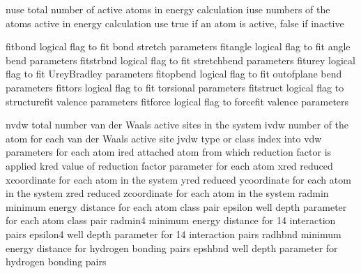 \documentclass[letterpaper,11pt,english]{sphinxmanual}
\begin{document}
\begin{sphinxVerbatim}[commandchars=\\\{\}]
nuse            total number of active atoms in energy calculation
iuse            numbers of the atoms active in energy calculation
use             true if an atom is active, false if inactive
\end{sphinxVerbatim}


\begin{sphinxVerbatim}[commandchars=\\\{\}]
fit\PYGZus{}bond        logical flag to fit bond stretch parameters
fit\PYGZus{}angle       logical flag to fit angle bend parameters
fit\PYGZus{}strbnd      logical flag to fit stretch\PYGZhy{}bend parameters
fit\PYGZus{}urey        logical flag to fit Urey\PYGZhy{}Bradley parameters
fit\PYGZus{}opbend      logical flag to fit out\PYGZhy{}of\PYGZhy{}plane bend parameters
fit\PYGZus{}tors        logical flag to fit torsional parameters
fit\PYGZus{}struct      logical flag to structure\PYGZhy{}fit valence parameters
fit\PYGZus{}force       logical flag to force\PYGZhy{}fit valence parameters
\end{sphinxVerbatim}


\begin{sphinxVerbatim}[commandchars=\\\{\}]
nvdw            total number van der Waals active sites in the system
ivdw            number of the atom for each van der Waals active site
jvdw            type or class index into vdw parameters for each atom
ired            attached atom from which reduction factor is applied
kred            value of reduction factor parameter for each atom
xred            reduced x\PYGZhy{}coordinate for each atom in the system
yred            reduced y\PYGZhy{}coordinate for each atom in the system
zred            reduced z\PYGZhy{}coordinate for each atom in the system
radmin          minimum energy distance for each atom class pair
epsilon         well depth parameter for each atom class pair
radmin4         minimum energy distance for 1\PYGZhy{}4 interaction pairs
epsilon4        well depth parameter for 1\PYGZhy{}4 interaction pairs
radhbnd         minimum energy distance for hydrogen bonding pairs
epshbnd         well depth parameter for hydrogen bonding pairs
\end{sphinxVerbatim}
\end{document}
